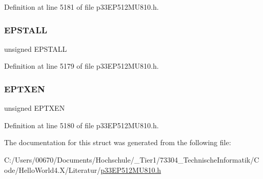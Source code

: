 Definition at line 5181 of file p33\+E\+P512\+M\+U810.\+h.

\mbox{\label{structtag_u1_e_p9_b_i_t_s_a47042104f04ebe06a23f9789bd400d7e}} 
\subsubsection{\texorpdfstring{E\+P\+S\+T\+A\+LL}{EPSTALL}}
{\footnotesize\ttfamily unsigned E\+P\+S\+T\+A\+LL}



Definition at line 5179 of file p33\+E\+P512\+M\+U810.\+h.

\mbox{\label{structtag_u1_e_p9_b_i_t_s_aa2d88c1be513e759c136823c86a355b4}} 
\subsubsection{\texorpdfstring{E\+P\+T\+X\+EN}{EPTXEN}}
{\footnotesize\ttfamily unsigned E\+P\+T\+X\+EN}



Definition at line 5180 of file p33\+E\+P512\+M\+U810.\+h.



The documentation for this struct was generated from the following file\+:\begin{DoxyCompactItemize}
\item 
C\+:/\+Users/00670/\+Documents/\+Hochschule/\+\_\+\+Tier1/73304\+\_\+\+Technische\+Informatik/\+Code/\+Hello\+World4.\+X/\+Literatur/\hyperlink{p33_e_p512_m_u810_8h}{p33\+E\+P512\+M\+U810.\+h}\end{DoxyCompactItemize}
